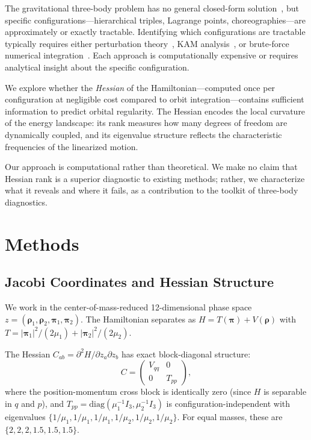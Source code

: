 \documentclass[aps,pre,twocolumn,superscriptaddress,floatfix]{revtex4-2}
\begin{document}
The gravitational three-body problem has no general closed-form
solution~\cite{poincare1892}, but specific configurations---hierarchical
triples, Lagrange points, choreographies---are approximately or exactly
tractable. Identifying which configurations are tractable typically
requires either perturbation theory~\cite{murray1999solar}, KAM
analysis~\cite{arnold1963small}, or brute-force numerical
integration~\cite{suvakov2013three}. Each approach is computationally
expensive or requires analytical insight about the specific
configuration.

We explore whether the \emph{Hessian} of the Hamiltonian---computed
once per configuration at negligible cost compared to orbit
integration---contains sufficient information to predict orbital
regularity. The Hessian encodes the local curvature of the energy
landscape: its rank measures how many degrees of freedom are
dynamically coupled, and its eigenvalue structure reflects the
characteristic frequencies of the linearized motion.

Our approach is computational rather than theoretical. We make no
claim that Hessian rank is a superior diagnostic to existing methods;
rather, we characterize what it reveals and where it fails, as a
contribution to the toolkit of three-body diagnostics.

\section{Methods}

\subsection{Jacobi Coordinates and Hessian Structure}

We work in the center-of-mass-reduced 12-dimensional phase space
$z = (\boldsymbol{\rho}_1, \boldsymbol{\rho}_2, \boldsymbol{\pi}_1,
\boldsymbol{\pi}_2)$. The Hamiltonian separates as
$H = T(\boldsymbol{\pi}) + V(\boldsymbol{\rho})$ with
$T = |\boldsymbol{\pi}_1|^2/(2\mu_1) + |\boldsymbol{\pi}_2|^2/(2\mu_2)$.

The Hessian $C_{ab} = \partial^2 H / \partial z_a \partial z_b$ has
exact block-diagonal structure:
\begin{equation}
C = \begin{pmatrix} V_{qq} & 0 \\ 0 & T_{pp} \end{pmatrix},
\end{equation}
where the position-momentum cross block is identically zero (since
$H$ is separable in $q$ and $p$), and $T_{pp} = \mathrm{diag}(\mu_1^{-1}
I_3, \mu_2^{-1} I_3)$ is configuration-independent with eigenvalues
$\{1/\mu_1, 1/\mu_1, 1/\mu_1, 1/\mu_2, 1/\mu_2, 1/\mu_2\}$.
For equal masses, these are $\{2, 2, 2, 1.5, 1.5, 1.5\}$.
\end{document}
